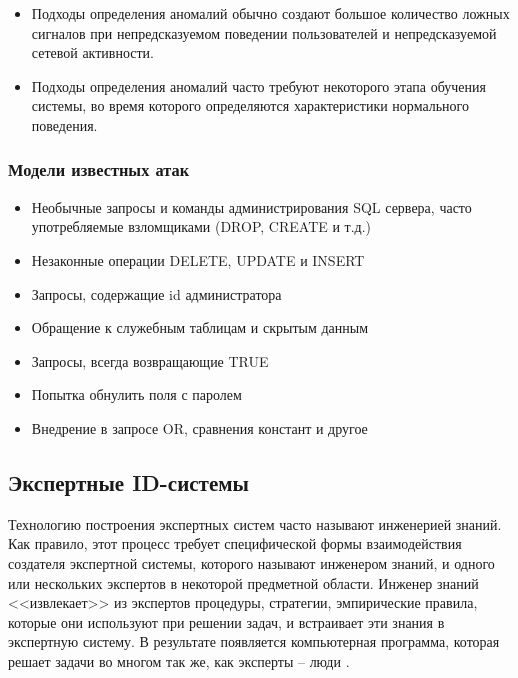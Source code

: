 \begin{itemize}
	\item Подходы определения аномалий обычно создают большое количество ложных сигналов 
	при непредсказуемом поведении пользователей и непредсказуемой сетевой активности.

	\item Подходы определения аномалий часто требуют некоторого этапа обучения системы, 
	во время которого определяются характеристики нормального поведения.
\end{itemize}



\subsubsection{Модели известных атак}

\begin{itemize}
	\item Необычные запросы и команды администрирования SQL сервера, часто употребляемые 
	взломщиками (DROP, CREATE и т.д.)
	\item Незаконные операции DELETE, UPDATE и INSERT
	\item Запросы, содержащие id администратора
	\item Обращение к служебным таблицам и скрытым данным
	\item Запросы, всегда возвращающие TRUE
	\item Попытка обнулить поля с паролем
	\item Внедрение в запросе OR, сравнения констант и другое
\end{itemize}



\subsection{Экспертные ID-системы}

Технологию построения экспертных систем часто называют инженерией знаний. Как правило, 
этот процесс требует специфической формы взаимодействия создателя экспертной системы, 
которого называют инженером знаний, и одного или нескольких экспертов в некоторой 
предметной области.  Инженер знаний <<извлекает>> из экспертов процедуры, стратегии,  
эмпирические правила, которые они используют при решении задач, и  встраивает эти знания 
в экспертную систему. В результате появляется   компьютерная программа, которая решает 
задачи во многом так же, как   эксперты -- люди \autocite{ExpertSystems}.

